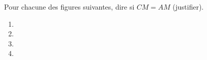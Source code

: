 
\begin{exercice}\label{exo2smath-0221}

    Pour chacune des figures suivantes, dire si \( CM=AM\) (justifier).
            
    \begin{enumerate}
  \item
     
\item
       
        \item
    
   \item
      
    \end{enumerate}

\end{exercice}
